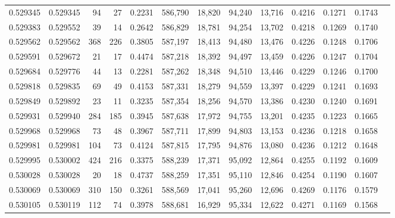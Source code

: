 \begin{tabular}{rrrrrrrrrrrrr}
0.529345 & 0.529345 &    94 &    27 &                                     0.2231 & 586,790 &  18,820 &  94,240 &  13,716 & 0.4216 & 0.1271 & 0.1743 \\
0.529383 & 0.529552 &    39 &    14 &                                     0.2642 & 586,829 &  18,781 &  94,254 &  13,702 & 0.4218 & 0.1269 & 0.1740 \\
0.529562 & 0.529562 &   368 &   226 &                                     0.3805 & 587,197 &  18,413 &  94,480 &  13,476 & 0.4226 & 0.1248 & 0.1706 \\
0.529591 & 0.529672 &    21 &    17 &                                     0.4474 & 587,218 &  18,392 &  94,497 &  13,459 & 0.4226 & 0.1247 & 0.1704 \\
0.529684 & 0.529776 &    44 &    13 &                                     0.2281 & 587,262 &  18,348 &  94,510 &  13,446 & 0.4229 & 0.1246 & 0.1700 \\
0.529818 & 0.529835 &    69 &    49 &                                     0.4153 & 587,331 &  18,279 &  94,559 &  13,397 & 0.4229 & 0.1241 & 0.1693 \\
0.529849 & 0.529892 &    23 &    11 &                                     0.3235 & 587,354 &  18,256 &  94,570 &  13,386 & 0.4230 & 0.1240 & 0.1691 \\
0.529931 & 0.529940 &   284 &   185 &                                     0.3945 & 587,638 &  17,972 &  94,755 &  13,201 & 0.4235 & 0.1223 & 0.1665 \\
0.529968 & 0.529968 &    73 &    48 &                                     0.3967 & 587,711 &  17,899 &  94,803 &  13,153 & 0.4236 & 0.1218 & 0.1658 \\
0.529981 & 0.529981 &   104 &    73 &                                     0.4124 & 587,815 &  17,795 &  94,876 &  13,080 & 0.4236 & 0.1212 & 0.1648 \\
0.529995 & 0.530002 &   424 &   216 &                                     0.3375 & 588,239 &  17,371 &  95,092 &  12,864 & 0.4255 & 0.1192 & 0.1609 \\
0.530028 & 0.530028 &    20 &    18 &                                     0.4737 & 588,259 &  17,351 &  95,110 &  12,846 & 0.4254 & 0.1190 & 0.1607 \\
0.530069 & 0.530069 &   310 &   150 &                                     0.3261 & 588,569 &  17,041 &  95,260 &  12,696 & 0.4269 & 0.1176 & 0.1579 \\
0.530105 & 0.530119 &   112 &    74 &                                     0.3978 & 588,681 &  16,929 &  95,334 &  12,622 & 0.4271 & 0.1169 & 0.1568 \\

\end{tabular}

